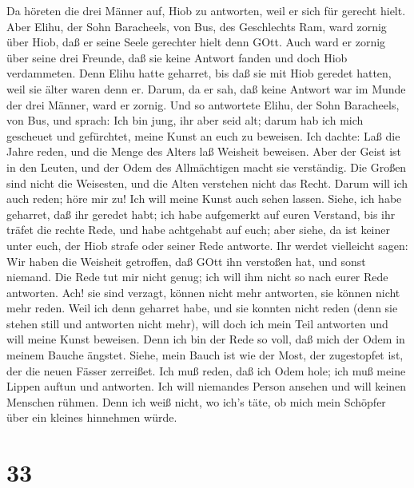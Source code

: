  Da höreten die drei Männer auf, Hiob zu antworten, weil er
sich für gerecht hielt.  Aber Elihu, der Sohn Baracheels,
von Bus, des Geschlechts Ram, ward zornig über Hiob, daß er seine Seele
gerechter hielt denn GOtt.  Auch ward er zornig über seine
drei Freunde, daß sie keine Antwort fanden und doch Hiob verdammeten.
 Denn Elihu hatte geharret, bis daß sie mit Hiob geredet
hatten, weil sie älter waren denn er.  Darum, da er sah, daß
keine Antwort war im Munde der drei Männer, ward er zornig. 
Und so antwortete Elihu, der Sohn Baracheels, von Bus, und sprach: Ich
bin jung, ihr aber seid alt; darum hab ich mich gescheuet und
gefürchtet, meine Kunst an euch zu beweisen.  Ich dachte:
Laß die Jahre reden, und die Menge des Alters laß Weisheit beweisen.
 Aber der Geist ist in den Leuten, und der Odem des
Allmächtigen macht sie verständig.  Die Großen sind nicht
die Weisesten, und die Alten verstehen nicht das Recht. 
Darum will ich auch reden; höre mir zu! Ich will meine Kunst auch sehen
lassen.  Siehe, ich habe geharret, daß ihr geredet habt;
ich habe aufgemerkt auf euren Verstand, bis ihr träfet die rechte Rede,
 und habe achtgehabt auf euch; aber siehe, da ist keiner
unter euch, der Hiob strafe oder seiner Rede antworte.  Ihr
werdet vielleicht sagen: Wir haben die Weisheit getroffen, daß GOtt ihn
verstoßen hat, und sonst niemand.  Die Rede tut mir nicht
genug; ich will ihm nicht so nach eurer Rede antworten. 
Ach! sie sind verzagt, können nicht mehr antworten, sie können nicht
mehr reden.  Weil ich denn geharret habe, und sie konnten
nicht reden (denn sie stehen still und antworten nicht mehr),
 will doch ich mein Teil antworten und will meine Kunst
beweisen.  Denn ich bin der Rede so voll, daß mich der Odem
in meinem Bauche ängstet.  Siehe, mein Bauch ist wie der
Most, der zugestopfet ist, der die neuen Fässer zerreißet. 
Ich muß reden, daß ich Odem hole; ich muß meine Lippen auftun und
antworten.  Ich will niemandes Person ansehen und will
keinen Menschen rühmen.  Denn ich weiß nicht, wo ich's
täte, ob mich mein Schöpfer über ein kleines hinnehmen würde.

\hypertarget{section-32}{%
\section{33}\label{section-32}}

